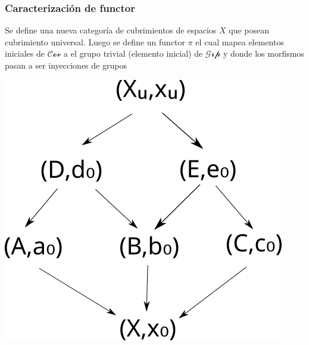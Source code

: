 \documentclass[xetex,mathserif,serif]{beamer}
\begin{document}
  \begin{frame}
    \frametitle{Caracterización de functor}
    \begin{block}{}
      Se define una nueva categoría de cubrimientos de espacios \(X\)
      que posean cubrimiento universal. Luego se define un functor
      \(\pi\) el cual mapea elementos iniciales de \(\mathscr{Cov}\) a
      el grupo trivial (elemento inicial) de \(\mathscr{Grp}\) y donde
      los morfismos pasan a ser inyecciones de grupos
    \end{block}
    \begin{block}{}
        \centering
        \includegraphics[scale=0.3]{../tesis/imagenes/cov.png}
      \end{block}
  \end{frame}
\end{document}
